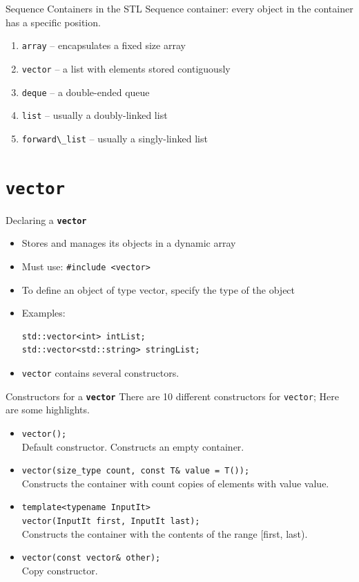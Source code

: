 \documentclass[14pt,aspectratio=1610]{beamer}
\begin{document}
\begin{frame}{Sequence Containers in the STL}
Sequence container: every object in the container has a specific position.

\begin{enumerate}
\item
  \lstinline{array} -- encapsulates a fixed size array
\item
  \lstinline{vector} -- a list with elements stored contiguously
\item
  \lstinline{deque} -- a double-ended queue
\item
  \lstinline{list} --  usually a doubly-linked list
  \item
  \lstinline{forward\_list} --  usually a singly-linked list
\end{enumerate}
\end{frame}


\section{\texttt{\bfseries vector}}

\begin{frame}[fragile]{Declaring a \texttt{\bfseries vector}}
\begin{itemize}
\item
  Stores and manages its objects in a dynamic array
\item
  Must use: \lstinline{#include <vector>}
\item
  To define an object of type vector, specify the type of the object
\item
  Examples:
  \begin{lstlisting}
std::vector<int> intList;
std::vector<std::string> stringList;
\end{lstlisting}
\item
  \lstinline{vector} contains several constructors.
\end{itemize}
\end{frame}

\begin{frame}[fragile]{Constructors for a \texttt{\bfseries vector}}
  \small
There are 10 different constructors for \lstinline{vector}; Here are some highlights.
\begin{itemize}
\item
  \lstinline{vector();}\\
  Default constructor. Constructs an empty container.
\item
  \lstinline{vector(size_type count, const T& value = T());}\\
  Constructs the container with count copies of elements with value value.
\item
  \lstinline{template<typename InputIt>}\\
  \lstinline{vector(InputIt first, InputIt last);}\\
  Constructs the container with the contents of the range [first, last).
\item
  \lstinline{vector(const vector& other);}\\
  Copy constructor.
\end{itemize}
\end{frame}
\end{document}

